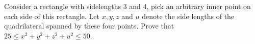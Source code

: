 Consider a rectangle with sidelengths 3 and 4, pick an arbitrary inner point on each side of this rectangle. Let $x, y, z$ and $u$ denote the side lengths of the quadrilateral spanned by these four points. Prove that $25 \leq x^2+y^2+z^2+u^2 \leq 50$.